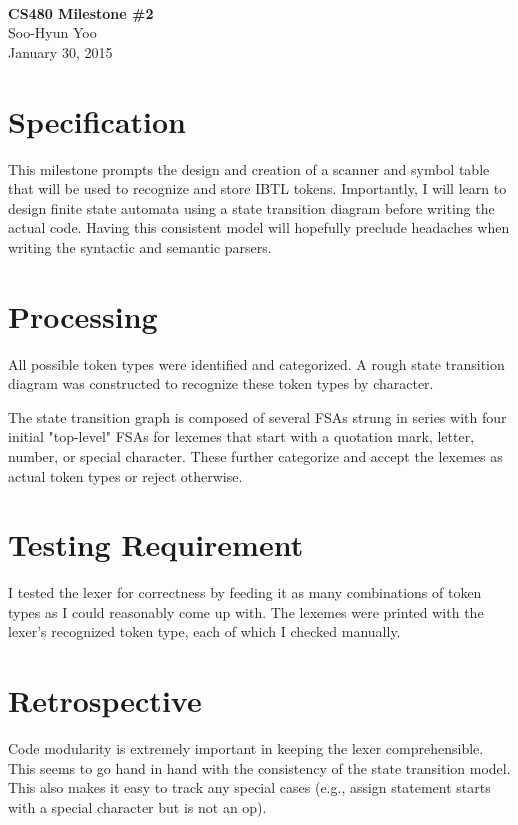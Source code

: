 \documentclass[12pt,letterpaper]{article}
\begin{document}
\fancyfoot{}
\begin{center}
    \hfill \\
    \vspace{4in}
    {\bf\Huge CS480 Milestone \#2 \\}
    \vspace{2in}
    {\Large Soo-Hyun Yoo \\ January 30, 2015}
\end{center}

\newpage
{}



\section*{Specification}

This milestone prompts the design and creation of a scanner and symbol table
that will be used to recognize and store IBTL tokens. Importantly, I will learn
to design finite state automata using a state transition diagram before writing
the actual code. Having this consistent model will hopefully preclude headaches
when writing the syntactic and semantic parsers.

\section*{Processing}

All possible token types were identified and categorized. A rough state
transition diagram was constructed to recognize these token types by character.

The state transition graph is composed of several FSAs strung in series with
four initial "top-level" FSAs for lexemes that start with a quotation mark,
letter, number, or special character. These further categorize and accept the
lexemes as actual token types or reject otherwise.

\section*{Testing Requirement}

I tested the lexer for correctness by feeding it as many combinations of token
types as I could reasonably come up with. The lexemes were printed with the
lexer's recognized token type, each of which I checked manually.

\section*{Retrospective}

Code modularity is extremely important in keeping the lexer comprehensible.
This seems to go hand in hand with the consistency of the state transition
model. This also makes it easy to track any special cases (e.g., assign
statement starts with a special character but is not an op).
\end{document}
